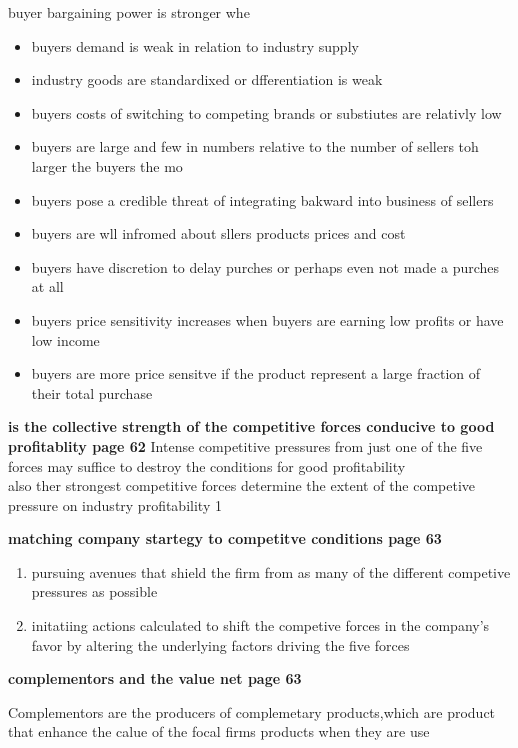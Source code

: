 \documentclass{report}
\begin{document}
buyer bargaining power is stronger whe 
\begin{itemize}
\item buyers demand is weak in relation to industry supply
\item industry goods are standardixed or dfferentiation is weak 
\item buyers costs of switching to competing brands or substiutes are relativly low 
\item  buyers are large and few in numbers  relative to the number of sellers toh larger the buyers the mo
\item buyers pose a credible threat of integrating bakward into business of sellers 
\item buyers are wll infromed about sllers products prices and cost 
\item buyers have discretion to delay purches or perhaps even not made a purches at all 
\item buyers price sensitivity increases when buyers are earning low profits or have low income
\item buyers are more price sensitve if the product represent a large fraction of their total purchase 

\end{itemize}

{\huge\textbf{is the collective strength of the competitive forces conducive to good profitablity page 62}}
Intense competitive pressures from just one of the five forces may suffice to destroy the conditions for good  profitability \\

also  ther strongest competitive forces determine the extent of the competive pressure on industry profitability 1


{\huge\textbf{matching company startegy to competitve conditions page 63 }}
\begin{enumerate}
\item pursuing avenues that shield the firm from as many of the different competive pressures as possible 
\item initatiing actions calculated to shift the competive forces in the company's favor by altering the underlying factors driving  the five forces 
\end{enumerate}

{\huge\textbf{complementors and the value net page 63}}

Complementors  are the producers of complemetary products,which are product that enhance the calue of the focal firms products when they are use 
\end{document}
